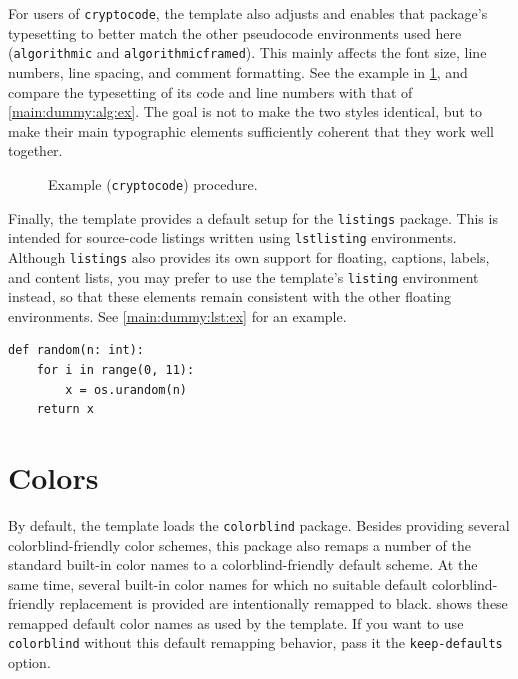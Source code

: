 For users of \verb|cryptocode|, the template also adjusts and enables that
package’s typesetting to better match the other pseudocode environments used
here (\verb|algorithmic| and \verb|algorithmicframed|). This mainly
affects the font size, line numbers, line spacing, and comment formatting. See
the example in \cref{main:dummy:cc:ex}, and compare the typesetting of its code
and line numbers with that of \cref{main:dummy:alg:ex}. The goal is not to make
the two styles identical, but to make their main typographic elements
sufficiently coherent that they work well together.

\begin{figure}
  \begin{pchstack}
  \end{pchstack}
  \caption{Example (\texttt{cryptocode}) procedure.}
  \label{main:dummy:cc:ex}
\end{figure}

Finally, the template provides a default setup for the \verb|listings| package.
This is intended for source-code listings written using \verb|lstlisting|
environments. Although \verb|listings| also provides its own support for
floating, captions, labels, and content lists, you may prefer to use the
template's \verb|listing| environment instead, so that these elements remain
consistent with the other floating environments. See \cref{main:dummy:lst:ex}
for an example.
\begin{listing}
  \caption{Example listing.}
  \label{main:dummy:lst:ex}
\begin{lstlisting}[language={[3]Python}]
def random(n: int):
    for i in range(0, 11):
        x = os.urandom(n)
    return x
\end{lstlisting}
\end{listing}

\section{Colors}\label{main:dummy:colors}

By default, the template loads the \verb|colorblind| package. Besides providing
several colorblind-friendly color schemes, this package also remaps a number of
the standard built-in color names to a colorblind-friendly default scheme. At
the same time, several built-in color names for which no suitable default
colorblind-friendly replacement is provided are intentionally remapped to black.
 shows these remapped default color names as used by
the template. If you want to use \verb|colorblind| without this default
remapping behavior, pass it the \verb|keep-defaults| option.

